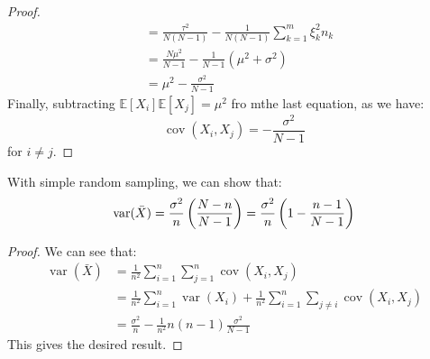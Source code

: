 \begin{proof}
\begin{equation*}
\begin{aligned}
        &= \frac{\tau^2}{N(N-1)} - \frac{1}{N(N-1)}\sum^m_{k=1}\xi_k^2n_k \\
        &= \frac{N\mu^2}{N-1} - \frac{1}{N-1}(\mu^2 + \sigma^2) \\
        &= \mu^2 - \frac{\sigma^2}{N-1}
    \end{aligned}
    \end{equation*}
    Finally, subtracting $\mathbb{E}[X_i]\mathbb{E}[X_j] = \mu^2$ fro mthe last equation, as we have:
    \begin{equation*}
        \operatorname{cov}(X_i, X_j) = -\frac{\sigma^2}{N-1}
    \end{equation*}
    for $i\ne j$.
\end{proof}

\begin{corollary}
    With simple random sampling, we can show that:
    \begin{equation*}
        \operatorname{var}(\bar{X}) = \frac{\sigma^2}{n}\left( \frac{N-n}{N-1} \right) = \frac{\sigma^2}{n}\left( 1-\frac{n-1}{N-1} \right)
    \end{equation*}
\end{corollary}
\begin{proof}
    We can see that:
    \begin{equation*}
    \begin{aligned}
        \operatorname{var}(\bar{X}) &= \frac{1}{n^2}\sum^n_{i=1}\sum^n_{j=1} \operatorname{cov}(X_i, X_j) \\
        &= \frac{1}{n^2}\sum^n_{i=1}\operatorname{var}(X_i) + \frac{1}{n^2}\sum^n_{i=1}\sum_{j\ne i} \operatorname{cov}(X_i, X_j) \\
        &= \frac{\sigma^2}{n} - \frac{1}{n^2}n(n-1)\frac{\sigma^2}{N-1}
    \end{aligned}
    \end{equation*}
    This gives the desired result.
\end{proof}

